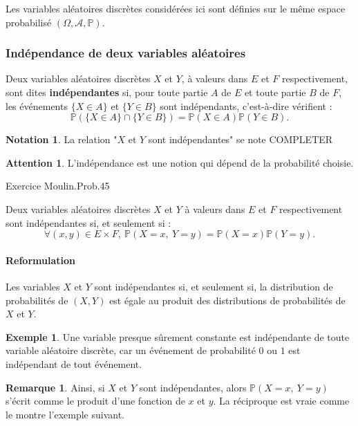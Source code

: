 \documentclass[french]{article}
\renewcommand{\P}{\mathbb{P}}
\theoremstyle{plain}
\theoremstyle{definition}
\newtheorem*{ex}{Exemple}
\newtheorem*{rmq}{Remarque}
\newtheorem*{notation}{Notation}
\newtheorem*{attention}{Attention}
\theoremstyle{remark}
\begin{document}
Les variables aléatoires discrètes considérées ici sont définies sur le même espace probabilisé $(\Omega,\mathcal{A},\P)$.

\subsubsection*{Indépendance de deux variables aléatoires}

\begin{dfn}
	Deux variables aléatoires discrètes $X$ et $Y$, à valeurs dans $E$ et $F$ respectivement, sont dites \textbf{indépendantes} si, pour toute partie $A$ de $E$ et toute partie $B$ de $F$, les événements $\{X\in A\}$ et $\{Y\in B\}$ sont indépendants, c'est-à-dire vérifient :
	$$\P(\{X\in A\}\cap\{Y\in B\})=\P(X\in A)\P(Y\in B).$$
\end{dfn}

\begin{notation}
	La relation "$X$ et $Y$ sont indépendantes" se note COMPLETER
\end{notation}

\begin{attention}
	L'indépendance est une notion qui dépend de la probabilité choisie.
\end{attention}

Exercice Moulin.Prob.45

\begin{prop}%
	Deux variables aléatoires discrètes $X$ et $Y$ à valeurs dans $E$ et $F$ respectivement sont indépendantes si, et seulement si : $$\forall (x,y)\in E\times F,\ \P(X=x,\ Y=y)=\P(X=x)\P(Y=y).$$
\end{prop}

\paragraph{Reformulation}
Les variables $X$ et $Y$ sont indépendantes si, et seulement si, la distribution de probabilités de $(X,Y)$ est égale au produit des distributions de probabilités de $X$ et $Y$.

\begin{ex}
	Une variable presque sûrement constante est indépendante de toute variable aléatoire discrète, car un événement de probabilité $0$ ou $1$ est indépendant de tout événement.
\end{ex}

\begin{rmq}
	Ainsi, si $X$ et $Y$ sont indépendantes, alors $\P(X=x,\ Y=y)$ s'écrit comme le produit d'une fonction de $x$ et $y$. La réciproque est vraie comme le montre l'exemple suivant.
\end{rmq}
\end{document}
